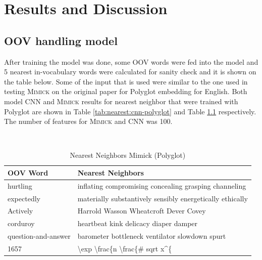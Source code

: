 \chapter{Results and Discussion}
\label{chap:results}
    \section{OOV handling model}
        After training the model was done, some OOV words were fed
        into the model and 5 nearest in-vocabulary words were
        calculated for sanity check and it is shown on the table
        below. Some of the input that is used were similar to the one used in testing
        \textsc{Mimick} on the original paper for Polyglot embedding
        for English. Both model CNN and \textsc{Mimick} results
        for nearest neighbor that were trained with Polyglot are shown
        in Table \ref{tab:nearest:cnn-polyglot} and Table
        \ref{tab:nearest:lstm-polyglot} respectively. The number of
        features for \textsc{Mimick} and CNN was 100.

        \begin{table}[H]
          \begin{center}
            \caption{Nearest Neighbors Mimick (Polyglot)}
            ~\\
            \footnotesize
            \label{tab:nearest:lstm-polyglot}
            \begin{tabular}{l|l}
              \textbf{OOV Word} & \textbf{Nearest Neighbors}\\
              \hline
              hurtling & inflating compromising concealing grasping channeling\\
              expectedly & materially substantively sensibly energetically ethically\\
              Actively & Harrold Wasson Wheatcroft Dever Covey\\
              corduroy & heartbeat kink delicacy diaper damper\\
              question-and-answer & barometer bottleneck ventilator slowdown spurt\\
              1657 & \textbackslash exp \textbackslash frac\{n \textbackslash frac\{\# sqrt x\^{}\{\\
            \end{tabular}
          \end{center}
        \end{table}

